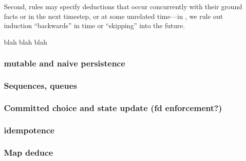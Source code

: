 Second, rules may specify
deductions that occur concurrently with their ground facts or in the next
timestep, or at some unrelated time---in \lang, we rule out induction ``backwards'' in time or
``skipping'' into the future.

blah blah blah

\subsubsection{mutable and naive persistence}


\subsubsection{Sequences, queues}
\subsubsection{Committed choice and state update (fd enforcement?)}
\subsubsection{idempotence}
\subsubsection{Map deduce}
